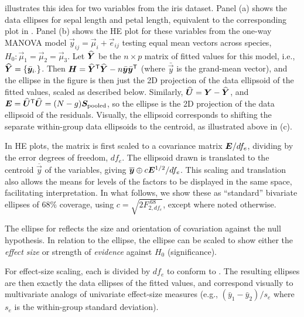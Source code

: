  illustrates this idea for two variables from the iris dataset.
Panel (a) shows the data ellipses for sepal length and petal length, equivalent to
the corresponding plot in . Panel (b) shows the HE plot for these
variables from the one-way MANOVA model $\vec{y}_{ij} = \vec{\mu}_i + \vec{e}_{ij}$
testing equal mean vectors across species, $H_0: \vec{\mu}_1 = \vec{\mu}_2 = \vec{\mu}_3$.
Let $\widehat{\bm{Y}}$ be the $n \times p$ matrix of fitted values for this model,
i.e., $\widehat{\bm{Y}} = \{ \bar{\bm{y}}_{i \cdot} \}$.
Then $\bm{H}= \widehat{\bm{Y}}^\mathsf{T} \widehat{\bm{Y}} - n\bar{\bm{y}} \bar{\bm{y}}^\mathsf{T} $ (where $\bar{\vec{y}}$ is the grand-mean vector), and the  ellipse in the figure is then just the
2D projection of the data ellipsoid
of the fitted values, scaled as described below.
Similarly, $\widehat{\bm{U}} = \bm{Y} - \widehat{\bm{Y}}$, and
$\bm{E} = \widehat{\bm{U}}^\mathsf{T}  \widehat{\bm{U}} = (N-g) \bm{S}_{\mathrm{pooled}}$, so the  ellipse is
the 2D projection of the data ellipsoid of the residuals.
Visually, the  ellipsoid corresponds to shifting the separate within-group data ellipsoids to the centroid,
as illustrated above in (c).

In HE plots, the  matrix is first scaled to a covariance matrix
$\bm{E}/df_e$, dividing by the error degrees of freedom, $df_e$.
The ellipsoid drawn is
translated to the centroid $\overline{\vec{y}}$ of the variables,
giving $\overline{\bm{y}} \oplus c \bm{E}^{1/2}/df_e$.
This scaling and translation
also allows the means for levels of the factors
to be displayed in the same space,
facilitating interpretation.
In what follows, we show these as
``standard'' bivariate ellipses of 68\% coverage,
using $c=\sqrt{2 F_{2, df_e}^{.68}}$, except where noted otherwise.

The ellipse for  reflects the size and orientation of covariation
against the null hypothesis.
In relation to the  ellipse, the  ellipse
can be scaled to show either the \emph{effect size} or strength of
\emph{evidence} against $H_0$ (significance).

For effect-size scaling, each  is divided by $df_e$ to conform
to .  The resulting ellipses are then exactly the data ellipses
of the fitted values, and correspond visually to multivariate analogs of
univariate effect-size measures (e.g., $(\bar{y}_1 - \bar{y}_2)/s_e$
where $s_e$ is the within-group standard deviation).

